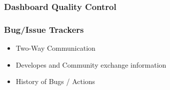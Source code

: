 \documentclass[18pt]{beamer}
\begin{document}
{
\begin{frame}
\frametitle{Dashboard Quality Control}
\end{frame}
}


\begin{frame}
\frametitle{Bug/Issue Trackers}
\Huge
\begin{itemize}
\item Two-Way Communication
\pause
\item Developes and Community exchange information
\pause
\item History of Bugs / Actions
\end{itemize}
\end{frame}
\end{document}
